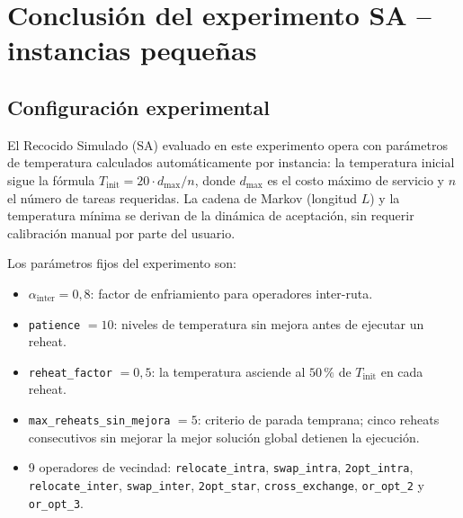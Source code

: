 

\section{Conclusión del experimento SA -- instancias pequeñas}
\label{sec:conclusion_sa_small}

\subsection{Configuración experimental}
\label{subsec:config_experimental}

El Recocido Simulado (SA) evaluado en este experimento opera con parámetros de temperatura
calculados automáticamente por instancia: la temperatura inicial sigue la fórmula
\(T_{\text{init}} = 20 \cdot d_{\max} / n\), donde \(d_{\max}\) es el costo máximo de
servicio y \(n\) el número de tareas requeridas. La cadena de Markov (longitud \(L\)) y
la temperatura mínima se derivan de la dinámica de aceptación, sin requerir calibración
manual por parte del usuario.

Los parámetros fijos del experimento son:

\begin{itemize}
  \item \(\alpha_{\text{inter}} = 0{,}8\): factor de enfriamiento para operadores
        inter-ruta.
  \item \texttt{patience} \(= 10\): niveles de temperatura sin mejora antes de ejecutar
        un reheat.
  \item \texttt{reheat\_factor} \(= 0{,}5\): la temperatura asciende al \(50\,\%\) de
        \(T_{\text{init}}\) en cada reheat.
  \item \texttt{max\_reheats\_sin\_mejora} \(= 5\): criterio de parada temprana; cinco
        reheats consecutivos sin mejorar la mejor solución global detienen la ejecución.
  \item 9 operadores de vecindad: \texttt{relocate\_intra}, \texttt{swap\_intra},
        \texttt{2opt\_intra}, \texttt{relocate\_inter}, \texttt{swap\_inter},
        \texttt{2opt\_star}, \texttt{cross\_exchange}, \texttt{or\_opt\_2} y
        \texttt{or\_opt\_3}.
\end{itemize}

